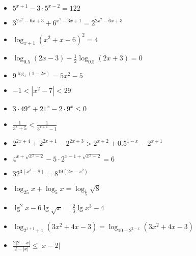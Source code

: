 \documentclass{article}
\begin{document}
\begin{itemize}
\item $\displaystyle 5^{x+1}-3\cdot5^{x-2}=122$
\item $\displaystyle 3^{2x^2-6x+3}+6^{x^2-3x+1}=2^{2x^2-6x+3}$
\end{itemize}



\begin{itemize}
\item $\displaystyle \log_{x+1}(x^2+x-6)^2=4$
\item $\displaystyle \log_{0.5}(2x-3)-\frac{1}{2}\log_{0.5}(2x+3)=0 $
\item $\displaystyle 9^{\log_3(1-2x)}=5x^2-5 $
\end{itemize}

\begin{itemize}
\item $-1 < |x^{2} - 7| < 29$
\end{itemize}

\begin{itemize}
\item $\displaystyle 3\cdot49^x+21^x-2\cdot9^x\leq0$
\item $\displaystyle \frac{1}{3^x+5}<\frac{1}{3^{x+1}-1}$
\item $\displaystyle 2^{2x+4}+2^{2x+1}-2^{2x+3}>2^{x+2}+0.5^{1-x}-2^{x+1}$
\end{itemize}

\begin{itemize}
\item $\displaystyle 4^{x+\sqrt{x^2-2}}-5\cdot2^{x-1+\sqrt{x^2-2}}=6$
\item $\displaystyle 32^{3(x^3-8)}=8^{19(2x-x^2)}$
\end{itemize}



\begin{itemize}
\item $\displaystyle \log_{25}x+\log_5x=\log_{\frac{1}{5}}\sqrt{8} $
\item $\displaystyle \lg^2 x-6\lg\sqrt{x}=\frac{2}{3}\lg x^3-4 $
\item $\displaystyle \log_{2^{x+1}+1}(3x^2+4x-3)=\log_{10-2^{2-x}}(3x^2+4x-3)$
\end{itemize}

\begin{itemize}
\item $\displaystyle \frac{2|2-x|}{2-|x|} \leq |x-2|$
\end{itemize}
\end{document}
